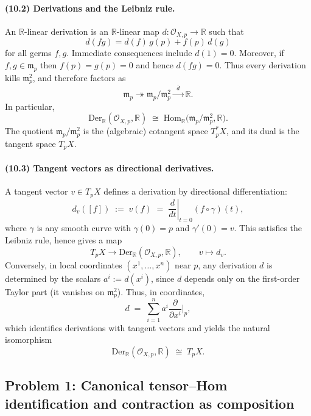 \documentclass[12pt,a4paper]{article}
\theoremstyle{plain}
\theoremstyle{definition}      %
\begin{document}
\paragraph{(10.2) Derivations and the Leibniz rule.}
An $\mathbb{R}$-linear derivation is an $\mathbb{R}$-linear map $d:\mathcal{O}_{X,p}\to \mathbb{R}$ such that
\[
d(fg)=d(f)\,g(p)+f(p)\,d(g)
\]
for all germs $f,g$. Immediate consequences include $d(1)=0$. Moreover, if $f,g\in \mathfrak{m}_p$ then
$f(p)=g(p)=0$ and hence $d(fg)=0$. Thus every derivation kills $\mathfrak{m}_p^2$, and therefore factors as
\[
\mathfrak{m}_p \twoheadrightarrow \mathfrak{m}_p/\mathfrak{m}_p^2 \xrightarrow{\;\;\bar d\;\;} \mathbb{R}.
\]
In particular,
\[
\mathrm{Der}_{\mathbb{R}}(\mathcal{O}_{X,p},\mathbb{R})
\;\cong\;
\mathrm{Hom}_{\mathbb{R}}\bigl(\mathfrak{m}_p/\mathfrak{m}_p^2,\mathbb{R}\bigr).
\]
The quotient $\mathfrak{m}_p/\mathfrak{m}_p^2$ is the (algebraic) cotangent space $T_p^*X$,
and its dual is the tangent space $T_pX$.

\paragraph{(10.3) Tangent vectors as directional derivatives.}
A tangent vector $v\in T_pX$ defines a derivation by directional differentiation:
\[
d_v([f]) \;:=\; v(f) \;=\; \left.\frac{d}{dt}\right|_{t=0} (f\circ \gamma)(t),
\]
where $\gamma$ is any smooth curve with $\gamma(0)=p$ and $\gamma'(0)=v$.
This satisfies the Leibniz rule, hence gives a map
\[
T_pX \longrightarrow \mathrm{Der}_{\mathbb{R}}(\mathcal{O}_{X,p},\mathbb{R}),\qquad v\mapsto d_v.
\]
Conversely, in local coordinates $(x^1,\dots,x^n)$ near $p$, any derivation $d$ is determined by the scalars
$a^i:=d(x^i)$, since $d$ depends only on the first-order Taylor part (it vanishes on $\mathfrak{m}_p^2$).
Thus, in coordinates,
\[
d \;=\; \sum_{i=1}^n a^i \frac{\partial}{\partial x^i}\Big|_p,
\]
which identifies derivations with tangent vectors and yields the natural isomorphism
\[
\mathrm{Der}_{\mathbb{R}}(\mathcal{O}_{X,p},\mathbb{R}) \;\cong\; T_pX.
\]
	
	
	
	\subsection*{Problem 1: Canonical tensor--Hom identification and contraction as composition}
	
\end{document}
